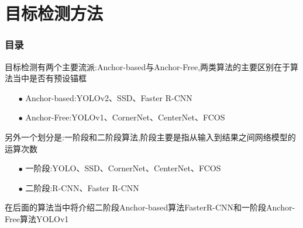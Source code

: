 \section{目标检测方法}

\begin{frame}[allowframebreaks]
    \frametitle{\textsc{目录}} \vspace{-0.3cm}
    \begin{spacing}{0.0}
    \end{spacing}   %
\end{frame}

\begin{frame}
    目标检测有两个主要流派:Anchor-based与Anchor-Free,两类算法的主要区别在于算法当中是否有预设锚框\\
    \begin{itemize}
        \item[$ \bullet $] Anchor-based:YOLOv2、SSD、Faster \;R-CNN
        \item[$ \bullet $] Anchor-Free:YOLOv1、CornerNet、CenterNet、FCOS
    \end{itemize}

    \vspace{1em}
    另外一个划分是:一阶段和二阶段算法,阶段主要是指从输入到结果之间网络模型的运算次数\\
    \begin{itemize}
        \item[$ \bullet $] 一阶段:YOLO、SSD、CornerNet、CenterNet、FCOS
        \item[$ \bullet $] 二阶段:R-CNN、Faster \;R-CNN
    \end{itemize}

    \vspace{1em}
    在后面的算法当中将介绍二阶段Anchor-based算法Faster\quad R-CNN和一阶段Anchor-Free算法YOLOv1\\

\end{frame}


